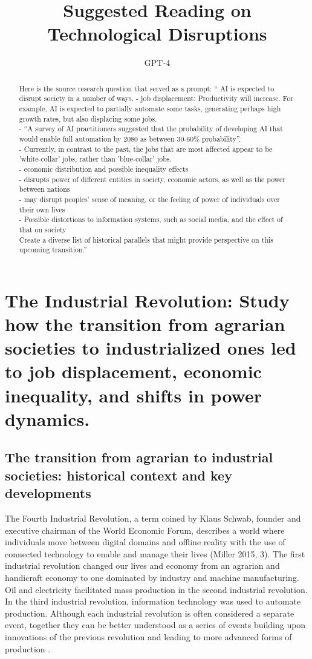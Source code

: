 \documentclass{article}
\title{Suggested Reading on Technological Disruptions
}
\date{}
\author{\hspace{1mm}GPT-4}%
\begin{document}
\maketitle

\begin{abstract}
Here is the source research question that served as a prompt: `` AI is expected to disrupt society in a number of ways.
- job displacement: Productivity will increase. For example, AI is expected to partially automate some tasks, generating perhaps high growth rates, but also displacing some jobs.\\
- ``A survey of AI practitioners suggested that the probability of developing AI that would enable full automation by 2080 as between 30-60\% probability''.\\
- Currently, in contrast to the past, the jobs that are most affected appear to be 'white-collar' jobs, rather than 'blue-collar' jobs.\\
- economic distribution and possible inequality effects\\
- disrupts power of different entities in society, economic actors, as well as the power between nations\\
- may disrupt peoples' sense of meaning, or the feeling of power of individuals over their own lives\\
- Possible distortions to information systems, such as social media, and the effect of that on society\\

Create a diverse list of historical parallels that might provide perspective on this upcoming transition.''
\end{abstract}


\section{The Industrial Revolution: Study how the transition from agrarian societies to industrialized ones led to job displacement, economic inequality, and shifts in power dynamics.}

\subsection{The transition from agrarian to industrial societies: historical context and key developments}

The Fourth Industrial Revolution, a term coined by Klaus Schwab, founder and executive chairman of the World Economic Forum, describes a world where individuals move between digital domains and offline reality with the use of connected technology to enable and manage their lives (Miller 2015, 3). The first industrial revolution changed our lives and economy from an agrarian and handicraft economy to one dominated by industry and machine manufacturing. Oil and electricity facilitated mass production in the second industrial revolution. In the third industrial revolution, information technology was used to automate production. Although each industrial revolution is often considered a separate event, together they can be better understood as a series of events building upon innovations of the previous revolution and leading to more advanced forms of production \cite{Xu2018TheFI}.
\end{document}
